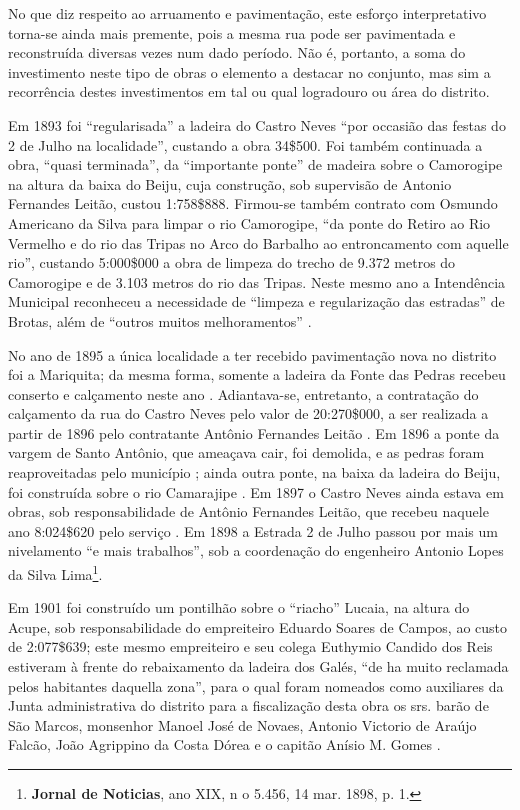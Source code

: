 No que diz respeito ao arruamento e pavimentação, este esforço interpretativo torna-se ainda mais premente, pois a mesma rua pode ser pavimentada e reconstruída diversas vezes num dado período. Não é, portanto, a soma do investimento neste tipo de obras o elemento a destacar no conjunto, mas sim a recorrência destes investimentos em tal ou qual logradouro ou área do distrito.

Em 1893 foi “regularisada” a ladeira do Castro Neves “por occasião das festas
do 2 de Julho na localidade”, custando a obra 34\$500. Foi também continuada a obra, “quasi terminada”, da “importante ponte” de madeira sobre o Camorogipe na altura da baixa do Beiju, cuja construção, sob supervisão de Antonio Fernandes Leitão, custou 1:758\$888. Firmou-se também contrato com Osmundo Americano da Silva para limpar o rio Camorogipe, “da ponte do Retiro ao Rio Vermelho e do rio das Tripas no Arco do Barbalho ao entroncamento com aquelle rio”, custando 5:000\$000 a obra de limpeza do trecho de 9.372 metros do Camorogipe e de 3.103 metros do rio das Tripas. Neste mesmo ano a Intendência Municipal reconheceu a necessidade de “limpeza e regularização das estradas” de Brotas, além de “outros muitos melhoramentos” \cite[pp.~47-48; anexo 3, pp.~18-19]{salvador_relatorio_1893}.

No ano de 1895 a única localidade a ter recebido pavimentação nova no distrito foi a Mariquita; da mesma forma, somente a ladeira da Fonte das
Pedras recebeu conserto e calçamento neste ano \cite[p.~16]{salvador_relatorio_1895}. Adiantava-se, entretanto, a contratação do calçamento da rua do Castro Neves pelo valor de 20:270\$000, a ser realizada a partir de 1896 pelo contratante Antônio Fernandes Leitão \cite[p.~23]{salvador_relatorio_1895}. Em 1896 a ponte da vargem de Santo Antônio, que ameaçava cair, foi demolida, e as pedras foram reaproveitadas pelo município \cite[p.~137]{salvador_relatorio_1895}; ainda outra ponte, na baixa da ladeira do Beiju, foi construída sobre o rio Camarajipe \cite[p.~156]{salvador_relatorio_1894}. Em 1897 o Castro Neves ainda estava em obras, sob responsabilidade de Antônio Fernandes Leitão, que recebeu naquele ano 8:024\$620 pelo serviço \cite[p.~99]{salvador_relatorio_1897}. Em 1898 a Estrada 2 de Julho passou por mais um nivelamento “e mais trabalhos”, sob a coordenação do engenheiro Antonio Lopes da Silva Lima\footnote{\textbf{Jornal de Noticias}, ano XIX, n o 5.456, 14 mar. 1898, p. 1.}.

Em 1901 foi construído um pontilhão sobre o “riacho” Lucaia, na altura do Acupe, sob responsabilidade do empreiteiro Eduardo Soares de Campos, ao custo de 2:077\$639; este mesmo empreiteiro e seu colega Euthymio Candido dos Reis estiveram à frente do rebaixamento da ladeira dos Galés, “de ha muito reclamada pelos habitantes daquella zona”, para o qual foram nomeados como auxiliares da Junta administrativa do distrito para a fiscalização desta obra os srs. barão de São Marcos, monsenhor Manoel José de Novaes, Antonio Victorio de Araújo Falcão, João Agrippino da Costa Dórea e o capitão Anísio M. Gomes \cite[pp.~15, 162, 249-250]{salvador_relatorio_1901}.


